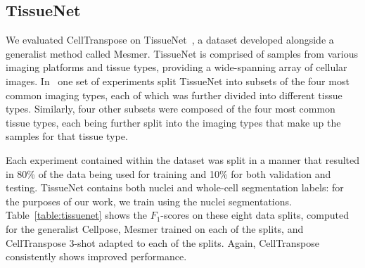 

\subsection{TissueNet}
We evaluated CellTranspose on TissueNet~\cite{Greenwald2021-uj}, a dataset developed alongside a generalist method called Mesmer. TissueNet is comprised of samples from various imaging platforms and tissue types, providing a wide-spanning array of cellular images. In~\cite{Greenwald2021-uj} one set of experiments split TissueNet into subsets of the four most common imaging types, each of which was further divided into different tissue types. Similarly, four other subsets were composed of the four most common tissue types, each being further split into the imaging types that make up the samples for that tissue type.

Each experiment contained within the dataset was split in a manner that resulted in 80\% of the data being used for training and 10\% for both validation and testing. TissueNet contains both nuclei and whole-cell segmentation labels: for the purposes of our work, we train using the nuclei segmentations.
Table~\ref{table:tissuenet} shows the $F_1$-scores on these eight data splits, computed for the generalist Cellpose, Mesmer trained on each of the splits, and CellTranspose 3-shot adapted to each of the splits. Again, CellTranspose consistently shows improved performance. 

